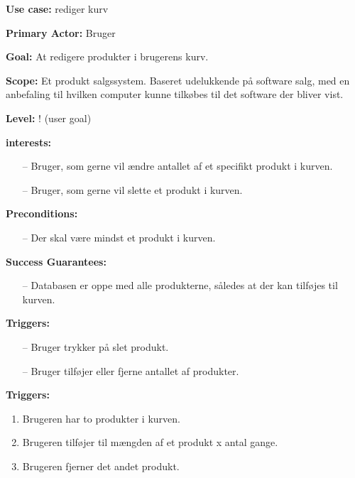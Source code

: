 \documentclass[11pt]{report}
\begin{document}
\noindent \textbf{Use case:} rediger kurv

\noindent \textbf{Primary Actor:} Bruger

\noindent \textbf{Goal:} At redigere produkter i brugerens kurv. 

\noindent \textbf{Scope:} Et produkt salgssystem. Baseret udelukkende på software salg, med en anbefaling til hvilken computer kunne tilkøbes til det software der bliver vist.

\noindent \textbf{Level:} ! (user goal) 


\noindent \textbf{interests:}
\begin{itemize}[topsep=0pt, partopsep=0pt]
  \item[--] Bruger, som gerne vil ændre antallet af et specifikt produkt i kurven.
  \item[--] Bruger, som gerne vil slette et produkt i kurven. 
\end{itemize}

\noindent \textbf{Preconditions:}
\begin{itemize}[topsep=0pt, partopsep=0pt]
  \item[--] Der skal være mindst et produkt i kurven.
\end{itemize}

\newpage
\noindent \textbf{Success Guarantees: }
\begin{itemize}[topsep=0pt, partopsep=0pt]
  \item[--] Databasen er oppe med alle produkterne, således at der kan tilføjes til kurven.
\end{itemize}

\noindent \textbf{Triggers:}
\begin{itemize}[topsep=0pt, partopsep=0pt]
  \item[--] Bruger trykker på slet produkt.
  \item[--] Bruger tilføjer eller fjerne antallet af produkter.
\end{itemize}

\noindent \textbf{Triggers:}
\begin{enumerate}[topsep=0pt, partopsep=0pt]
  \item Brugeren har to produkter i kurven.
  \item Brugeren tilføjer til mængden af et produkt x antal gange.
  \item Brugeren fjerner det andet produkt.
\end{enumerate}



\newpage
\end{document}
